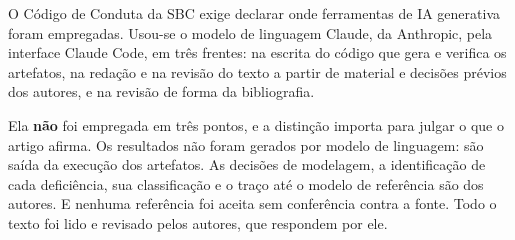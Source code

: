 O Código de Conduta da SBC exige declarar onde ferramentas de IA generativa foram empregadas. Usou-se o modelo de linguagem Claude, da Anthropic, pela interface Claude Code, em três frentes: na escrita do código que gera e verifica os artefatos, na redação e na revisão do texto a partir de material e decisões prévios dos autores, e na revisão de forma da bibliografia.

Ela \textbf{não} foi empregada em três pontos, e a distinção importa para julgar o que o artigo afirma. Os resultados não foram gerados por modelo de linguagem: são saída da execução dos artefatos. As decisões de modelagem, a identificação de cada deficiência, sua classificação e o traço até o modelo de referência são dos autores. E nenhuma referência foi aceita sem conferência contra a fonte. Todo o texto foi lido e revisado pelos autores, que respondem por ele.
